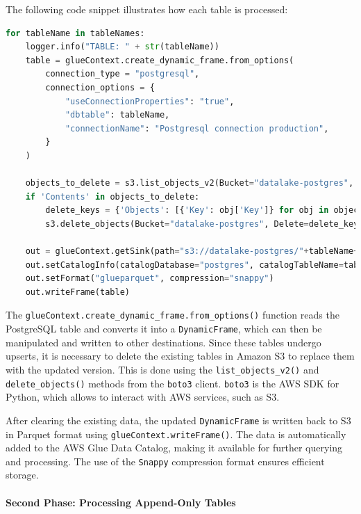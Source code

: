 The following code snippet illustrates how each table is processed:

\begin{lstlisting}[language=Python, caption=First phase Postgres extraction]
for tableName in tableNames:
    logger.info("TABLE: " + str(tableName))
    table = glueContext.create_dynamic_frame.from_options(
        connection_type = "postgresql",
        connection_options = {
            "useConnectionProperties": "true",
            "dbtable": tableName,
            "connectionName": "Postgresql connection production",
        }
    )
    
    objects_to_delete = s3.list_objects_v2(Bucket="datalake-postgres", Prefix=tableName+"/")
    if 'Contents' in objects_to_delete:
        delete_keys = {'Objects': [{'Key': obj['Key']} for obj in objects_to_delete['Contents']]}
        s3.delete_objects(Bucket="datalake-postgres", Delete=delete_keys)

    out = glueContext.getSink(path="s3://datalake-postgres/"+tableName+"/", connection_type="s3", updateBehavior="UPDATE_IN_DATABASE", partitionKeys=[], enableUpdateCatalog=True, transformation_ctx="write_"+tableName)
    out.setCatalogInfo(catalogDatabase="postgres", catalogTableName=tableName)
    out.setFormat("glueparquet", compression="snappy")
    out.writeFrame(table)
\end{lstlisting}

The \texttt{glueContext.create\_dynamic\_frame.from\_options()} function reads the PostgreSQL table and converts it into a \texttt{DynamicFrame}, which can then be manipulated and written to other destinations. Since these tables undergo upserts, it is necessary to delete the existing tables in Amazon \ac{S3} to replace them with the updated version. This is done using the \texttt{list\_objects\_v2()} and \texttt{delete\_objects()} methods from the \texttt{boto3} client. \texttt{boto3} is the \ac{AWS} \ac{SDK} for Python, which allows to interact with \ac{AWS} services, such as \ac{S3}.

After clearing the existing data, the updated \texttt{DynamicFrame} is written back to \ac{S3} in Parquet format using \texttt{glueContext.writeFrame()}. The data is automatically added to the \ac{AWS} Glue Data Catalog, making it available for further querying and processing. The use of the \texttt{Snappy} compression format ensures efficient storage.

\paragraph{Second Phase: Processing Append-Only Tables}

